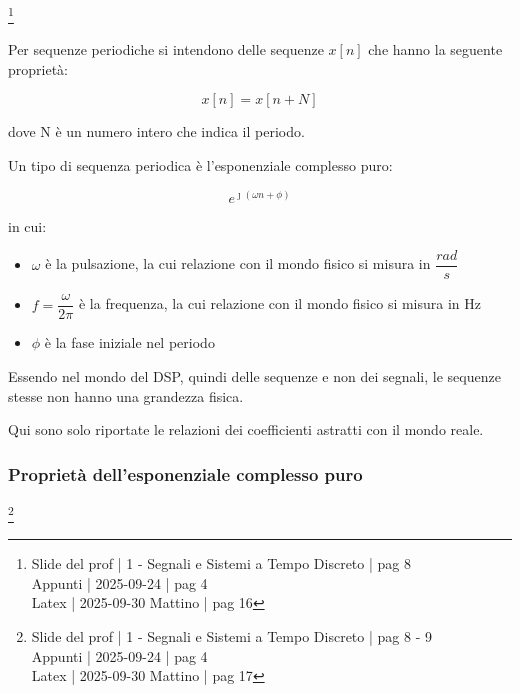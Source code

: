 \footnote{ 
    Slide del prof | 1 - Segnali e Sistemi a Tempo Discreto | pag 8 \\
    Appunti | 2025-09-24 | pag 4 \\ 
    Latex | 2025-09-30 Mattino | pag 16
}

Per sequenze periodiche si intendono delle sequenze $x \left[ n \right]$ che hanno la seguente proprietà: 

{
    \Large 
    \begin{equation}
        x \left[ n \right] 
        = 
        x \left[ n + N\right] 
    \end{equation}
}

dove N è un numero intero che indica il periodo. \newline 

Un tipo di sequenza periodica è l'esponenziale complesso puro: 

{
    \Large 
    \begin{equation}
        e^{\jmath \left( \omega n + \phi\right)}
    \end{equation}
}

in cui: 

\begin{itemize}
    \item $\omega$ è la pulsazione, la cui relazione con il mondo fisico si misura in $\dfrac{rad}{s}$ 
    \item $f = \dfrac{\omega}{2 \pi}$ è la frequenza, la cui relazione con il mondo fisico si misura in Hz 
    \item $\phi$ è la fase iniziale nel periodo
\end{itemize}

\begin{tcolorbox}
    Essendo nel mondo del DSP, quindi delle sequenze e non dei segnali, le sequenze stesse non hanno una grandezza fisica. \newline 

    Qui sono solo riportate le relazioni dei coefficienti astratti con il mondo reale.
\end{tcolorbox}

\newpage 

\subsubsection{Proprietà dell'esponenziale complesso puro}

\footnote{ 
    Slide del prof | 1 - Segnali e Sistemi a Tempo Discreto | pag 8 - 9\\
    Appunti | 2025-09-24 | pag 4 \\ 
    Latex | 2025-09-30 Mattino | pag 17
}

